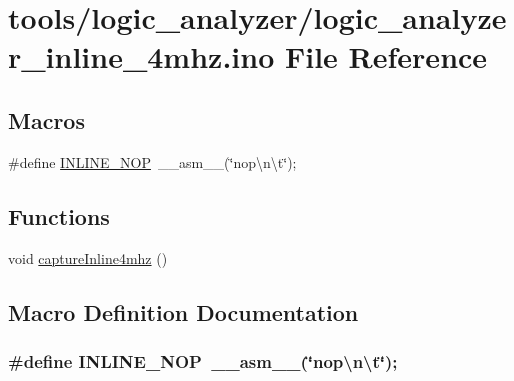 \hypertarget{logic__analyzer__inline__4mhz_8ino}{\section{tools/logic\-\_\-analyzer/logic\-\_\-analyzer\-\_\-inline\-\_\-4mhz.ino File Reference}
\label{logic__analyzer__inline__4mhz_8ino}
}
\subsection*{Macros}
\begin{DoxyCompactItemize}
\item 
\#define \hyperlink{logic__analyzer__inline__4mhz_8ino_a74bd53df34dc120803c8536d944b8d46}{I\-N\-L\-I\-N\-E\-\_\-\-N\-O\-P}~\-\_\-\-\_\-asm\-\_\-\-\_\-(\char`\"{}nop\textbackslash{}n\textbackslash{}t\char`\"{});
\end{DoxyCompactItemize}
\subsection*{Functions}
\begin{DoxyCompactItemize}
\item 
void \hyperlink{logic__analyzer__inline__4mhz_8ino_a11da6e167562837efd1d10b040a3141d}{capture\-Inline4mhz} ()
\end{DoxyCompactItemize}


\subsection{Macro Definition Documentation}
\hypertarget{logic__analyzer__inline__4mhz_8ino_a74bd53df34dc120803c8536d944b8d46}{
\subsubsection[{I\-N\-L\-I\-N\-E\-\_\-\-N\-O\-P}]{\setlength{\rightskip}{0pt plus 5cm}\#define I\-N\-L\-I\-N\-E\-\_\-\-N\-O\-P~\-\_\-\-\_\-asm\-\_\-\-\_\-(\char`\"{}nop\textbackslash{}n\textbackslash{}t\char`\"{});}}\label{logic__analyzer__inline__4mhz_8ino_a74bd53df34dc120803c8536d944b8d46}


